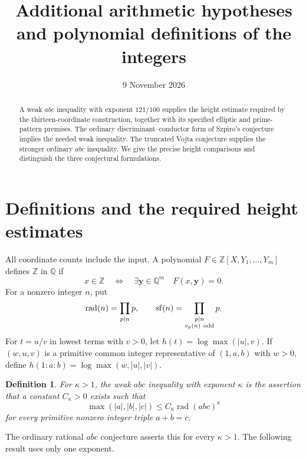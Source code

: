\documentclass[11pt,a4paper]{article}
\title{Additional arithmetic hypotheses\\and polynomial definitions of the integers}
\author{}\date{9 November 2026}
\newtheorem{definition}[theorem]{Definition}
\newcommand{\Q}{\mathbb Q}\newcommand{\Z}{\mathbb Z}
\DeclareMathOperator{\rad}{rad}
\DeclareMathOperator{\sfpart}{sf}
\begin{document}
\maketitle
\begin{abstract}
A weak $abc$ inequality with exponent $121/100$ supplies the height
estimate required by the thirteen-coordinate construction, together
with its specified elliptic and prime-pattern premises. The ordinary
discriminant--conductor form of Szpiro's conjecture implies the needed
weak inequality. The truncated Vojta conjecture supplies the stronger
ordinary $abc$ inequality. We give the precise height comparisons and
distinguish the three conjectural formulations.
\end{abstract}

\section{Definitions and the required height estimates}

All coordinate counts include the input. A polynomial
$F\in\Z[X,Y_1,\ldots,Y_m]$ defines $\Z$ in $\Q$ if
\[
 x\in\Z\quad\Longleftrightarrow\quad
 \exists\mathbf y\in\Q^m\quad F(x,\mathbf y)=0.
\]
For a nonzero integer $n$, put
\[
 \rad(n)=\prod_{p\mid n}p,\qquad
 \sfpart(n)=\prod_{\substack{p\mid n\\v_p(n)\ {\rm odd}}}p.
\]
For $t=u/v$ in lowest terms with $v>0$, let
$h(t)=\log\max(|u|,v)$. If $(w,u,v)$ is a primitive common
integer representative of $(1,a,b)$ with $w>0$, define
$h(1:a:b)=\log\max(w,|u|,|v|)$.

\begin{definition}
For $\kappa>1$, the weak $abc$ inequality with exponent $\kappa$
is the assertion that a constant $C_\kappa>0$ exists such that
\[
 \max(|a|,|b|,|c|)
 \le C_\kappa\rad(abc)^\kappa
\]
for every primitive nonzero integer triple $a+b=c$.
\end{definition}

The ordinary rational $abc$ conjecture asserts this for every
$\kappa>1$. The following result uses only one exponent.
\end{document}
